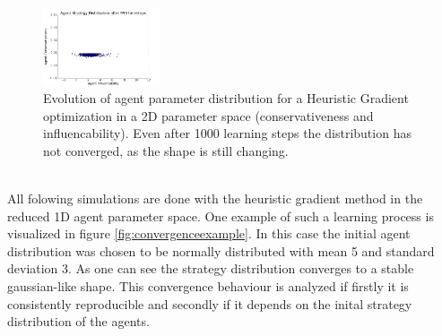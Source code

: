 \documentclass[11pt]{article}
\begin{document}
\begin{figure}
  \includegraphics[width=0.31\textwidth]{figures/2dsim_6.png}
  \caption[2D simulation]{Evolution of agent parameter distribution for a Heuristic Gradient optimization in a 2D parameter space (conservativeness and influencability). Even after 1000 learning steps the distribution has not converged, as the shape is still changing.}
  \label{fig:2dsimulation}
\end{figure}

\hfill \\
All folowing simulations are done with the heuristic gradient method in the reduced 1D agent parameter space. One example of such a learning process is visualized in figure \ref{fig:convergenceexample}. In this case the initial agent distribution was chosen to be normally distributed with mean 5 and standard deviation 3. As one can see the strategy distribution converges to a stable gaussian-like shape. This convergence behaviour is analyzed if firstly it is consistently reproducible and secondly if it depends on  the inital strategy distribution of the agents. \\
\end{document}
